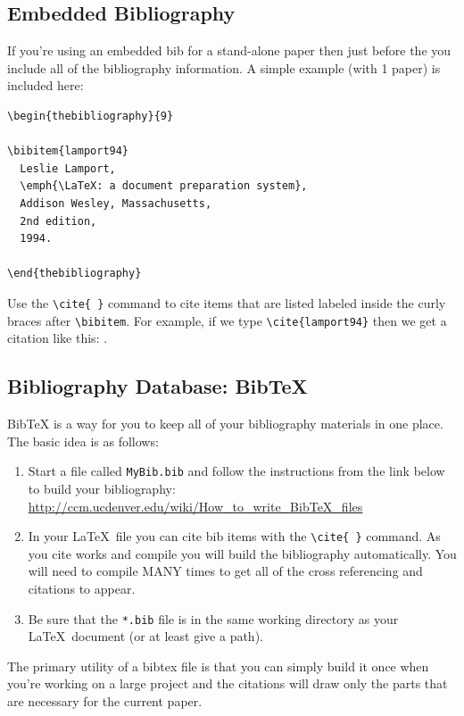 \subsection{Embedded Bibliography}
If you're using an embedded bib for a stand-alone paper then just before the
\verb|| you include all of the bibliography information.  A simple example
(with 1 paper) is included here:
\begin{verbatim}
\begin{thebibliography}{9}

\bibitem{lamport94}
  Leslie Lamport,
  \emph{\LaTeX: a document preparation system},
  Addison Wesley, Massachusetts,
  2nd edition,
  1994.

\end{thebibliography}
\end{verbatim}

Use the \verb|\cite{ }|  command to cite items that are listed
labeled inside the curly braces after \verb|\bibitem|.   For
example, if we type \verb|\cite{lamport94}| then we get a citation like this:
\cite{lamport94}.


\subsection{Bibliography Database: BibTeX}
BibTeX is a way for you to keep all of your bibliography materials in one place.  The
basic idea is as follows: 
\begin{enumerate}
    \item Start a file called \texttt{MyBib.bib} and follow the instructions from the link
        below to build your bibliography:\\
        \href{http://ccm.ucdenver.edu/wiki/How_to_write_BibTeX_files}{http://ccm.ucdenver.edu/wiki/How\_to\_write\_BibTeX\_files}
    \item In your \LaTeX\ file you can cite bib items with the \verb|\cite{ }| command.
          As you cite works and compile you will build the
        bibliography automatically.  You will need to compile MANY times to get all of the
        cross referencing and citations to appear.
    \item Be sure that the \texttt{*.bib} file is in the same working directory as your
        \LaTeX\ document (or at least give a path).
\end{enumerate}

The primary utility of a bibtex file is that you can simply build it once when you're
working on a large project and the citations will draw only the parts that are necessary
for the current paper.  




